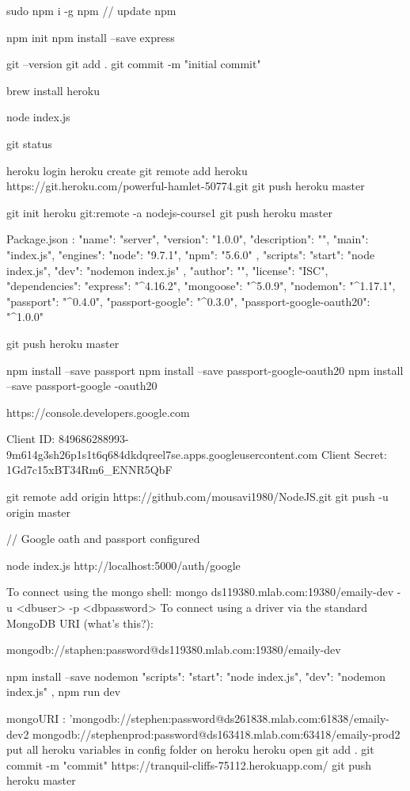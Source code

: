 


sudo npm i -g npm  // update npm

npm init
npm install --save express

git --version
git add .
git commit -m "initial commit"

brew install heroku

node index.js

git status

heroku login
heroku create
git remote add heroku https://git.heroku.com/powerful-hamlet-50774.git
git push heroku master

git init
heroku git:remote -a nodejs-course1
git push heroku master

Package.json :
{
	"name": "server",
	"version": "1.0.0",
	"description": "",
	"main": "index.js",
	"engines": {
		"node": "9.7.1",
		"npm": "5.6.0"
	},
	"scripts": {
		"start": "node index.js",
		"dev": "nodemon index.js"
	},
	"author": "",
	"license": "ISC",
	"dependencies": {
		"express": "^4.16.2",
		"mongoose": "^5.0.9",
		"nodemon": "^1.17.1",
		"passport": "^0.4.0",
		"passport-google": "^0.3.0",
		"passport-google-oauth20": "^1.0.0"
	}
}


git push heroku master

npm install --save passport 
npm install --save passport-google-oauth20
npm install --save passport-google -oauth20


https://console.developers.google.com

Client ID: 849686288993-9m614g3sh26p1s1t6q684dkdqreel7se.apps.googleusercontent.com
Client Secret: 1Gd7c15xBT34Rm6_ENNR5QbF

git remote add origin https://github.com/mousavi1980/NodeJS.git
git push -u origin master

// Google oath and passport configured

node index.js
http://localhost:5000/auth/google

To connect using the mongo shell:
mongo ds119380.mlab.com:19380/emaily-dev -u <dbuser> -p <dbpassword>
To connect using a driver via the standard MongoDB URI (what's this?):

mongodb://staphen:password@ds119380.mlab.com:19380/emaily-dev

npm install --save nodemon
"scripts": {
	"start": "node index.js",
	"dev": "nodemon index.js"
},
npm run dev

mongoURI : 'mongodb://stephen:password@ds261838.mlab.com:61838/emaily-dev2
mongodb://stephenprod:password@ds163418.mlab.com:63418/emaily-prod2
put all heroku variables in config folder on heroku
heroku open
git add .
git commit -m "commit"
https://tranquil-cliffs-75112.herokuapp.com/
git push heroku master


